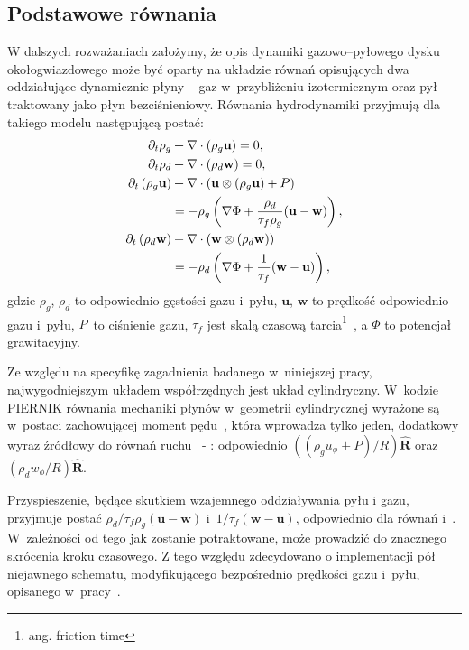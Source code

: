 \subsection{Podstawowe równania}
W dalszych rozważaniach założymy, że opis dynamiki gazowo--pyłowego dysku
okołogwiazdowego może być oparty na układzie równań opisujących dwa oddziałujące
dynamicznie płyny -- gaz w~przybliżeniu izotermicznym oraz  pył traktowany jako
płyn bezciśnieniowy. Równania hydrodynamiki przyjmują dla takiego modelu
następującą postać:
%
\begin{align}
   \partial_t \rho_g &+ \nabla\cdot\left(\rho_g\mathbf{u}\right) = 0,\label{eq1}\\
   \partial_t \rho_d &+ \nabla\cdot\left(\rho_d\mathbf{w}\right) = 0,\label{eq2}\\
\partial_t \left(\rho_g\mathbf{u}\right) &+
   \nabla\cdot(\mathbf{u}\otimes(\rho_g\mathbf{u})+P) \notag\\
 &= -\rho_g\left(\nabla\Phi +
\frac{\rho_d}{\tau_f\rho_g}(\mathbf{u}-\mathbf{w})\right),\label{eq3}\\
\partial_t \left(\rho_d\mathbf{w}\right) &+
\nabla\cdot(\mathbf{w}\otimes(\rho_d\mathbf{w})) \notag\\
 &= -\rho_d\left(\nabla\Phi + \frac{1}{\tau_f}(\mathbf{w}-\mathbf{u})\right),
\label{eq4}
\end{align}
gdzie $\rho_g$, $\rho_d$ to odpowiednio gęstości gazu i~pyłu, $\mathbf{u}$,
$\mathbf{w}$ to prędkość odpowiednio gazu i~pyłu, $P$~to ciśnienie gazu,
$\tau_f$ jest skalą czasową tarcia\footnote{ang. friction time}~,
a $\Phi$ to potencjał grawitacyjny.
%
\par Ze względu na specyfikę zagadnienia badanego w~niniejszej pracy,
najwygodniejszym układem współrzędnych jest układ cylindryczny. W~kodzie
\textsc{PIERNIK}
równania mechaniki płynów w~geometrii cylindrycznej wyrażone są w~postaci
zachowującej moment pędu~\cite{M07,SO10}, która wprowadza tylko jeden, dodatkowy
wyraz źródłowy do równań ruchu~ - : odpowiednio
$\left((\rho_g u_\phi + P) / R\right)\mathbf{\hat{R}}$ oraz $(\rho_d w_\phi / R)
\mathbf{\hat{R}}$.
%
\par Przyspieszenie, będące skutkiem wzajemnego oddziaływania pyłu i gazu,
przyjmuje postać $\rho_d/\tau_f\rho_g(\mathbf{u}-\mathbf{w})$
i~$1/\tau_f(\mathbf{w}-\mathbf{u})$, odpowiednio dla równań 
i~. W~zależności od tego jak zostanie potraktowane, może prowadzić do
znacznego skrócenia kroku czasowego. Z tego względu zdecydowano o implementacji
pół niejawnego schematu, modyfikującego bezpośrednio prędkości gazu i~pyłu,
opisanego w~pracy~\cite{TB09}.
%
